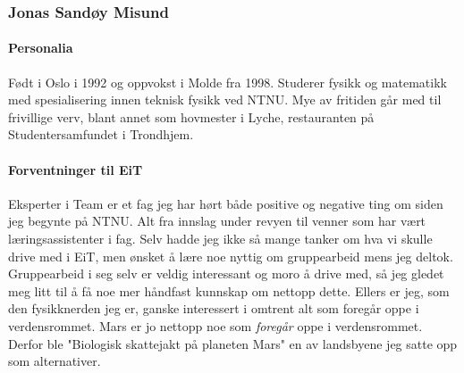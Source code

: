 \subsubsection{Jonas Sandøy Misund}

\paragraph{Personalia}
Født i Oslo i 1992 og oppvokst i Molde fra 1998.
Studerer fysikk og matematikk med spesialisering innen teknisk fysikk ved NTNU.
Mye av fritiden går med til frivillige verv, blant annet som hovmester i Lyche, restauranten på Studentersamfundet i Trondhjem.

\paragraph{Forventninger til EiT}
Eksperter i Team er et fag jeg har hørt både positive og negative ting om siden jeg begynte på NTNU.
Alt fra innslag under revyen til venner som har vært læringsassistenter i fag.
Selv hadde jeg ikke så mange tanker om hva vi skulle drive med i EiT, men ønsket å lære noe nyttig om gruppearbeid mens jeg deltok.
Gruppearbeid i seg selv er veldig interessant og moro å drive med, så jeg gledet meg litt til å få noe mer håndfast kunnskap om nettopp dette.
Ellers er jeg, som den fysikknerden jeg er, ganske interessert i omtrent alt som foregår oppe i verdensrommet.
Mars er jo nettopp noe som \textit{foregår} oppe i verdensrommet.
Derfor ble "Biologisk skattejakt på planeten Mars" en av landsbyene jeg satte opp som alternativer.